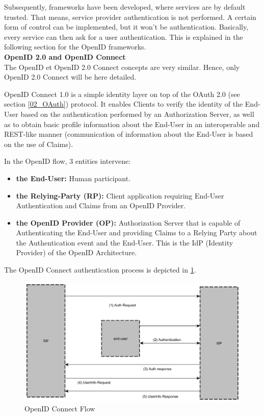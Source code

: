 Subsequently, frameworks have been developed, where services are by default trusted. That means, service provider authentication is not performed. A certain form of control can be implemented, but it won't be authentication. Basically, every service can then ask for a user authentication. This is explained in the following section for the OpenID frameworks. \\
 
\quad \tabitem \textbf{OpenID 2.0 and OpenID Connect}\\
\label{02_OpenID}
The OpenID et OpenID 2.0 Connect concepts are very similar. Hence, only OpenID 2.0 Connect will be here detailed.

OpenID Connect 1.0 is a simple identity layer on top of the OAuth 2.0 (see section \ref{02_OAuth}) protocol. It enables Clients to verify the identity of the End-User based on the authentication performed by an Authorization Server, as well as to obtain basic profile information about the End-User in an interoperable and REST-like manner\cite{sakimura2014openid} (communication of information about the End-User is based on the use of Claims).

In the OpenID flow, 3 entities intervene: 
\begin{itemize}
	\item \textbf{the End-User:} Human participant.
	\item \textbf{the Relying-Party (RP):} Client application requiring End-User Authentication and Claims from an OpenID Provider.
	\item \textbf{the OpenID Provider (OP):} Authorization Server that is capable of Authenticating the End-User and providing Claims to a Relying Party about the Authentication event and the End-User. This is the IdP (Identity Provider) of the OpenID Architecture.
\end{itemize}


The OpenID Connect authentication process is depicted in \ref{fig:OPIDCFlow}.

\begin{figure}[!ht]
	\centering
	\caption{OpenID Connect Flow}
	\label{fig:OPIDCFlow}
	\includegraphics[width=1\textwidth]{images/openID_connect.jpg}
\end{figure}

